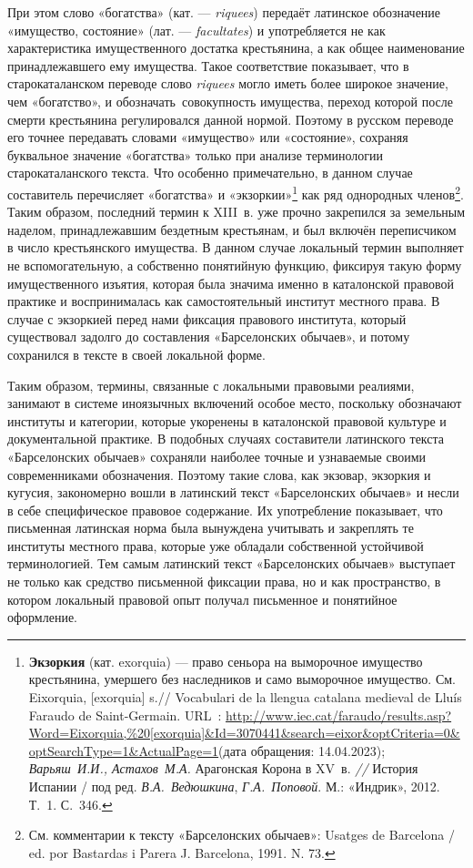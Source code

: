 При этом слово «богатства» (кат. --- \emph{riquees}) передаёт латинское обозначение «имущество, состояние» (лат. --- \emph{facultates}) и употребляется не как характеристика имущественного достатка крестьянина, а как общее наименование принадлежавшего ему имущества. Такое соответствие показывает, что в старокаталанском переводе слово \emph{riquees} могло иметь более широкое значение, чем «богатство», и обозначать~совокупность имущества, переход которой после смерти крестьянина регулировался данной нормой. Поэтому в русском переводе его точнее передавать словами «имущество» или «состояние», сохраняя буквальное значение «богатства» только при анализе терминологии старокаталанского текста. Что особенно примечательно, в данном случае составитель перечисляет «богатства» и «экзоркии»\footnote{\textbf{Экзоркия} (кат. exorquia) --- право сеньора на выморочное имущество крестьянина, умершего без наследников и само выморочное имущество. См. Eixorquia, [exorquia] s.// Vocabulari de la llengua catalana medieval de Lluís Faraudo de Saint-Germain. URL~: \url{http://www.iec.cat/faraudo/results.asp?Word=Eixorquia,\%20[exorquia]&Id=3070441&search=eixor&optCriteria=0&optSearchType=1&ActualPage=1}(дата обращения: 14.04.2023); \emph{Варьяш~И.И., Астахов~М.А.} Арагонская Корона в XV~в. \emph{// }История Испании / под ред. \emph{В.А.~Ведюшкина}, \emph{Г.А.~Поповой}. М.: «Индрик», 2012. Т.~1. С.~346.} как ряд однородных членов\footnote{См. комментарии к тексту «Барселонских обычаев»: Usatges de Barcelona / ed. por Bastardas i Parera J. Barcelona, 1991. N. 73.}. Таким образом, последний термин к XIII~в. уже прочно закрепился за земельным наделом, принадлежавшим бездетным крестьянам, и был включён переписчиком в число крестьянского имущества. В данном случае локальный термин выполняет не вспомогательную, а собственно понятийную функцию, фиксируя такую форму имущественного изъятия, которая была значима именно в каталонской правовой практике и воспринималась как самостоятельный институт местного права. В случае с экзоркией перед нами фиксация правового института, который существовал задолго до составления «Барселонских обычаев», и потому сохранился в тексте в своей локальной форме.

Таким образом, термины, связанные с локальными правовыми реалиями, занимают в системе иноязычных включений особое место, поскольку обозначают институты и категории, которые укоренены в каталонской правовой культуре и документальной практике. В подобных случаях составители латинского текста «Барселонских обычаев» сохраняли наиболее точные и узнаваемые своими современниками обозначения. Поэтому такие слова, как экзовар, экзоркия и кугусия, закономерно вошли в латинский текст «Барселонских обычаев» и несли в себе специфическое правовое содержание. Их употребление показывает, что письменная латинская норма была вынуждена учитывать и закреплять те институты местного права, которые уже обладали собственной устойчивой терминологией. Тем самым латинский текст «Барселонских обычаев» выступает не только как средство письменной фиксации права, но и как пространство, в котором локальный правовой опыт получал письменное и понятийное оформление.

